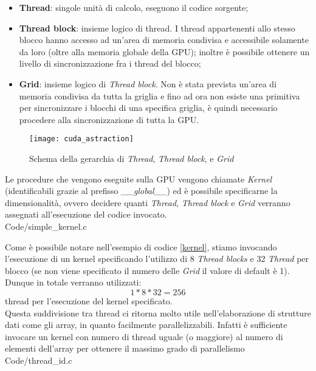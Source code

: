 \begin{itemize}
    \item
        \textbf{Thread}: singole unità di calcolo, eseguono il codice sorgente;
    \item
        \textbf{Thread block}: insieme logico di thread. I thread appartenenti
        allo stesso blocco hanno accesso ad un'area di memoria condivisa e
        accessibile solamente da loro (oltre alla memoria globale della GPU);
        inoltre è possibile ottenere un livello di sincronizzazione fra i thread
        del blocco;
    \item
        \textbf{Grid}: insieme logico di \textit{Thread block}. Non è stata
        prevista un'area di memoria condivisa da tutta la griglia e fino ad ora non
        esiste una primitiva per sincronizzare i blocchi di una specifica
        griglia, è quindi necessario procedere alla sincronizzazione di
        tutta la GPU.
\end{itemize}

\begin{figure}[H]
    \centering
    \texttt{[image: cuda\_astraction]}
    \caption{Schema della gerarchia di \textit{Thread}, \textit{Thread block}, e
        \textit{Grid} \cite[p.~59]{nickolls2010gpu}}
\end{figure}

Le procedure che vengono eseguite sulla GPU vengono chiamate \textit{Kernel}
(identificabili grazie al prefisso \textit{\_\_global\_\_})
ed è possibile specificarne la dimensionalità, ovvero decidere quanti
\textit{Thread}, \textit{Thread block} e \textit{Grid} verranno assegnati
all'esecuzione del codice invocato.
\\

    {Code/simple_kernel.c}

Come è possibile notare nell'esempio di codice \ref{kernel}, stiamo invocando
l'esecuzione di un kernel specificando l'utilizzo di 8 \textit{Thread blocks} e
32 \textit{Thread} per blocco (se non viene specificato il numero delle
\textit{Grid} il valore di default è 1).
\\
Dunque in totale verranno utilizzati: $$1 * 8 * 32 = 256$$ thread per
l'esecuzione del kernel specificato.
\\
Questa suddivisione tra thread ci ritorna molto utile nell'elaborazione di
strutture dati come gli array, in quanto facilmente parallelizzabili.
Infatti è sufficiente invocare un kernel con numero di thread uguale
(o maggiore) al numero di elementi dell'array per ottenere il massimo grado
di parallelismo
\\

    {Code/thread_id.c}
